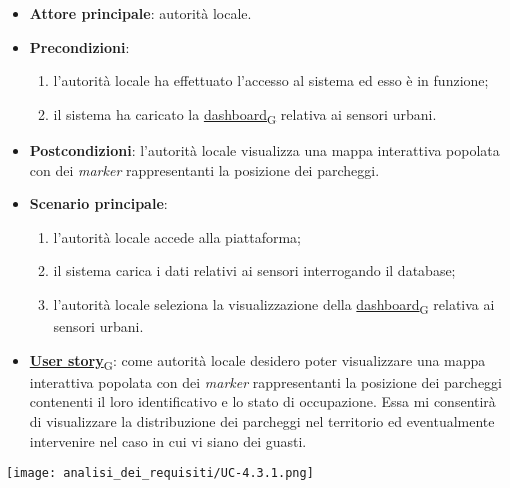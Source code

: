 \newpage
{}
\begin{itemize}
	\item \textbf{Attore principale}: autorità locale.
	\item \textbf{Precondizioni}:
	      \begin{enumerate}
		      \item l'autorità locale ha effettuato l'accesso al sistema ed esso è in funzione;
		      \item il sistema ha caricato la \href{https://7last.github.io/docs/pb/documentazione-interna/glossario\#dashboard}{dashboard\textsubscript{G}} relativa ai sensori urbani.
	      \end{enumerate}
	\item \textbf{Postcondizioni}: l'autorità locale visualizza una mappa interattiva popolata con dei \textit{marker} rappresentanti la posizione dei parcheggi.
	\item \textbf{Scenario principale}:
	      \begin{enumerate}
		      \item l'autorità locale accede alla piattaforma;
		      \item il sistema carica i dati relativi ai sensori interrogando il database;
		      \item l'autorità locale seleziona la visualizzazione della \href{https://7last.github.io/docs/pb/documentazione-interna/glossario\#dashboard}{dashboard\textsubscript{G}} relativa ai sensori urbani.
	      \end{enumerate}
	\item \href{https://7last.github.io/docs/pb/documentazione-interna/glossario\#user-story}{\textbf{User story}\textsubscript{G}}:
	      come autorità locale desidero poter visualizzare una mappa interattiva popolata con dei \textit{marker} rappresentanti la posizione dei parcheggi
	      contenenti il loro identificativo e lo stato di occupazione. Essa mi consentirà di visualizzare la distribuzione dei parcheggi nel territorio
	      ed eventualmente intervenire nel caso in cui vi siano dei guasti.
\end{itemize}
\begin{center}
	\texttt{[image: analisi\_dei\_requisiti/UC-4.3.1.png]}
\end{center}

